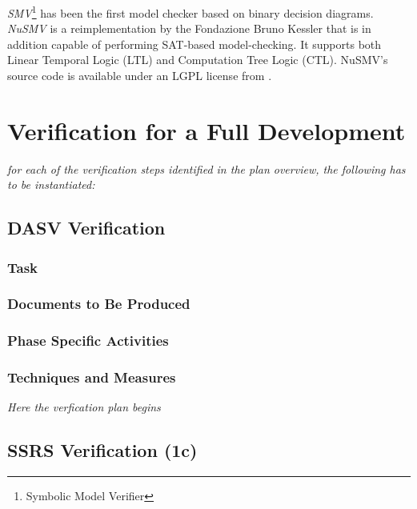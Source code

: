 \documentclass{template/openetcs_report}
\begin{document}
{\em SMV}\footnote{
        Symbolic Model Verifier
}
has been the first model checker based on binary decision
diagrams.
%
{\em NuSMV} is a reimplementation by the Fondazione Bruno Kessler
that is in addition capable of
performing SAT-based model-checking.
%
It supports both
Linear Temporal Logic (LTL) and Computation Tree Logic (CTL).
%
NuSMV's source code is available under an LGPL license from
\cite{nusmv}.



\section{Verification for a Full Development}
\label{sec:verif-full-devel}

\textit{for each of the verification steps identified in the plan
  overview, the following has to be instantiated: }
\subsection{DASV Verification}
\label{sec:dasv-verification}

\subsubsection{Task}
\label{sec:dasv-verif-task}

\subsubsection{Documents to Be Produced}
\label{sec:dasv-verif-docum-be-prod}

\subsubsection{Phase Specific Activities}
\label{sec:dasv-verif-phase-spec-activ}

\subsubsection{Techniques and Measures}
\label{sec:dasv-verif-techniques-measures}

\textit{Here the verfication plan begins}

\subsection{SSRS Verification (1c)}
\label{sec:ssrs-verification}
\end{document}
